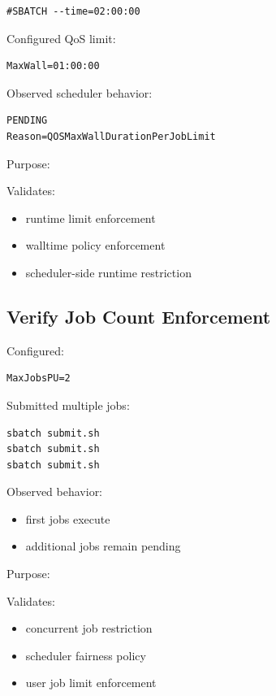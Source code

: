 \documentclass[11pt]{article}
\begin{document}
\begin{verbatim}
#SBATCH --time=02:00:00
\end{verbatim}

Configured QoS limit:

\begin{verbatim}
MaxWall=01:00:00
\end{verbatim}

Observed scheduler behavior:

\begin{verbatim}
PENDING
Reason=QOSMaxWallDurationPerJobLimit
\end{verbatim}

Purpose:

Validates:

\begin{itemize}
\item runtime limit enforcement
\item walltime policy enforcement
\item scheduler-side runtime restriction
\end{itemize}
\subsection{Verify Job Count Enforcement}
\label{sec:org03e8668}

Configured:

\begin{verbatim}
MaxJobsPU=2
\end{verbatim}

Submitted multiple jobs:

\begin{verbatim}
sbatch submit.sh
sbatch submit.sh
sbatch submit.sh
\end{verbatim}

Observed behavior:

\begin{itemize}
\item first jobs execute
\item additional jobs remain pending
\end{itemize}

Purpose:

Validates:

\begin{itemize}
\item concurrent job restriction
\item scheduler fairness policy
\item user job limit enforcement
\end{itemize}
\end{document}
